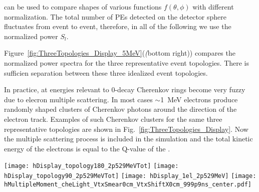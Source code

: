 can be used to compare shapes of various functions $f(\theta,\phi)$ with different normalization. The total number of PEs detected on the detector sphere fluctuates from event to event, therefore, in all of the following we use the normalized power $S_l$.

Figure~\ref{fig:ThreeTopologies_Display_5MeV}(\emph(bottom right)) compares the normalized power spectra for the three representative event topologies.
There is sufficien separation between these three idealized event topologies.

In practice, at energies relevant to 0\nbb-decay Cherenkov rings become very fuzzy due to elecron multiple scattering. In most cases $\sim$1~MeV 
electrons produce randomly shaped clusters of Cherenkov photons around the direction of the electron track. Examples of such Cherenkov clusters
for the same three representative topologies are shown in Fig.~\ref{fig:ThreeTopologies_Display}. Now the multiple scattering process is included 
in the simulation and the total kinetic energy of the electrons is equal to the Q-value of the \Te.


\begin{figure*}[h]
  \centering
  \texttt{[image: hDisplay\_topology180\_2p529MeVTot]}
  \texttt{[image: hDisplay\_topology90\_2p529MeVTot]}
  \texttt{[image: hDisplay\_1el\_2p529MeV]}
  \texttt{[image: hMultipleMoment\_cheLight\_VtxSmear0cm\_VtxShiftX0cm\_999p9ns\_center.pdf]}
  \caption{\emph{Top pannels and bottom left pannel:} Event displays for the three representative event topologies with the electron energies relevant 
    for the {\Te} 0{\nbb}-decay: two back-to-back 1.26~MeV electrons (\emph{top left}), two 1.26~MeV electrons at 90$^{\circ}$ angle 
    (\emph{top right}), and a single 2.53~MeV electron (\emph{bottom left}). Multiple scattering is now properly included in the simulation
    For the illustration purposes 100\% QE is applied to cherenkov photons (triangles) and the default QE is applied to scintillation 
    photons (dots). All electrons originate at the center of the detector. One typical event is shown for each topology.
    \emph{Bottom right pannel:} Normalized power spectrum $S_l$ calculated for distribution of cherenkov photons only. The three
    topologies are compared: two back-to-back 1.26~MeV electrons (\emph{solid red line}), two 1.26~MeV electrons at 90$^{\circ}$ angle
    (\emph{dotted magenta line}), and a single 2.53~MeV electron (\emph{dashed blue line}). For each topology 1000 events were simulated.
    The normalized power values $S_l$'s were calculated for each individual event. The horizontal lines correspond to the mean values of
    $S_l$ within each event topology. The vertical bars show one standard deviation from the mean value.}
  \label{fig:ThreeTopologies_Display}
\end{figure*}


